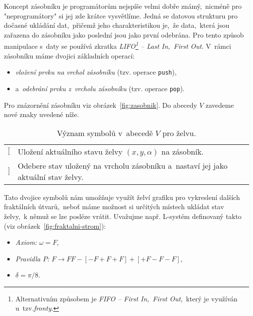 Koncept zásobníku je programátorům nejspíše velmi dobře známý,~nicméně pro "neprogramátory" si jej zde krátce vysvětlíme. Jedná se datovou strukturu pro dočasné ukládání dat,~přičemž jeho charakteristikou je,~že data,~která jsou zařazena do zásobníku jako poslední jsou jako první odebrána. Pro tento způsob manipulace s~daty se používá zkratka \emph{LIFO\footnote{Alternativním způsobem je \emph{FIFO -- First In,~First Out},~který je využíván u~tzv.\emph{fronty}.} -- Last In,~First Out}. V~rámci zásobníku máme dvojici základních operací:
\begin{itemize}
    \item \emph{vložení prvku na vrchol zásobníku} (tzv. operace \texttt{push}),~
    \item a~\emph{odebrání prvku z~vrcholu zásobníku} (tzv. operace \texttt{pop}).
\end{itemize}
Pro znázornění zásobníku viz obrázek~\ref{fig:zasobnik}. Do abecedy $V$ zavedeme nové znaky uvedené níže. 
\begin{table}[H]
    \centering
    \begin{tabular}{lp{}}
        $[$ & Uložení aktuálního stavu želvy $(x,y,\alpha)$ na zásobník.\\
        $]$ & Odebere stav uložený na vrcholu zásobníku a~nastaví jej jako aktuální stav želvy.
    \end{tabular}
    \caption{Význam symbolů v~abecedě $V$ pro želvu.}
    \label{table:vyznam-symbolu-zelva-zasobnik}
\end{table}
Tato dvojice symbolů nám umožňuje využít želví grafiku pro vykreslení dalších fraktálních útvarů,~neboť máme možnost si určitých místech ukládat stav želvy,~k němuž se lze posléze vrátit. Uvažujme např. L-systém definovaný takto (viz obrázek~\ref{fig:fraktalni-strom}):
\begin{itemize}
    \item \emph{Axiom:} $\omega=F$,
    \item \emph{Pravidla $P$:} $F\to FF-[-F+F+F]+[+F-F-F]$,
    \item $\delta=\pi/8$.
\end{itemize}
\newpage
